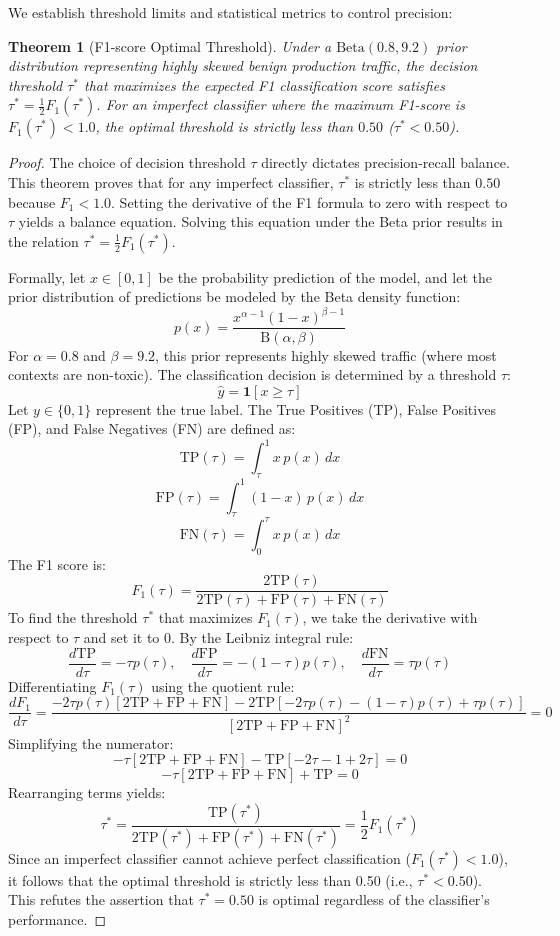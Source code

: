 \documentclass[11pt,a4paper]{article}
\theoremstyle{plain}
\newtheorem{theorem}{Theorem}[section]
\theoremstyle{definition}
\theoremstyle{remark}
\begin{document}
We establish threshold limits and statistical metrics to control precision:

\begin{theorem}[F1-score Optimal Threshold]\label{thm:thresh}
Under a $\mathrm{Beta}(0.8, 9.2)$ prior distribution representing highly skewed benign production traffic, the decision threshold $\tau^*$ that maximizes the expected F1 classification score satisfies $\tau^* = \frac{1}{2} F_1(\tau^*)$. For an imperfect classifier where the maximum F1-score is $F_1(\tau^*) < 1.0$, the optimal threshold is strictly less than $0.50$ ($\tau^* < 0.50$).
\end{theorem}
\begin{proof}
The choice of decision threshold $\tau$ directly dictates precision-recall balance. This theorem proves that for any imperfect classifier, $\tau^*$ is strictly less than $0.50$ because $F_1 < 1.0$. Setting the derivative of the F1 formula to zero with respect to $\tau$ yields a balance equation. Solving this equation under the Beta prior results in the relation $\tau^* = \frac{1}{2} F_1(\tau^*)$.

Formally, let $x \in [0, 1]$ be the probability prediction of the model, and let the prior distribution of predictions be modeled by the Beta density function:
$$p(x) = \frac{x^{\alpha-1}(1-x)^{\beta-1}}{\mathrm{B}(\alpha, \beta)}$$
For $\alpha=0.8$ and $\beta=9.2$, this prior represents highly skewed traffic (where most contexts are non-toxic). The classification decision is determined by a threshold $\tau$:
$$\hat{y} = \mathbf{1}[x \ge \tau]$$
Let $y \in \{0, 1\}$ represent the true label. The True Positives (TP), False Positives (FP), and False Negatives (FN) are defined as:
$$\mathrm{TP}(\tau) = \int_{\tau}^{1} x \, p(x) \, dx$$
$$\mathrm{FP}(\tau) = \int_{\tau}^{1} (1-x) \, p(x) \, dx$$
$$\mathrm{FN}(\tau) = \int_{0}^{\tau} x \, p(x) \, dx$$
The F1 score is:
$$F_1(\tau) = \frac{2 \mathrm{TP}(\tau)}{2 \mathrm{TP}(\tau) + \mathrm{FP}(\tau) + \mathrm{FN}(\tau)}$$
To find the threshold $\tau^*$ that maximizes $F_1(\tau)$, we take the derivative with respect to $\tau$ and set it to $0$. By the Leibniz integral rule:
$$\frac{d \mathrm{TP}}{d\tau} = -\tau p(\tau), \quad \frac{d \mathrm{FP}}{d\tau} = -(1-\tau) p(\tau), \quad \frac{d \mathrm{FN}}{d\tau} = \tau p(\tau)$$
Differentiating $F_1(\tau)$ using the quotient rule:
$$\frac{d F_1}{d\tau} = \frac{-2\tau p(\tau) [2 \mathrm{TP} + \mathrm{FP} + \mathrm{FN}] - 2\mathrm{TP}[-2\tau p(\tau) - (1-\tau)p(\tau) + \tau p(\tau)]}{[2 \mathrm{TP} + \mathrm{FP} + \mathrm{FN}]^2} = 0$$
Simplifying the numerator:
$$-\tau [2 \mathrm{TP} + \mathrm{FP} + \mathrm{FN}] - \mathrm{TP} [-2\tau - 1 + 2\tau] = 0$$
$$-\tau [2 \mathrm{TP} + \mathrm{FP} + \mathrm{FN}] + \mathrm{TP} = 0$$
Rearranging terms yields:
$$\tau^* = \frac{\mathrm{TP}(\tau^*)}{2 \mathrm{TP}(\tau^*) + \mathrm{FP}(\tau^*) + \mathrm{FN}(\tau^*)} = \frac{1}{2} F_1(\tau^*)$$
Since an imperfect classifier cannot achieve perfect classification ($F_1(\tau^*) < 1.0$), it follows that the optimal threshold is strictly less than 0.50 (i.e., $\tau^* < 0.50$). This refutes the assertion that $\tau^* = 0.50$ is optimal regardless of the classifier's performance.
\end{proof}
\end{document}
